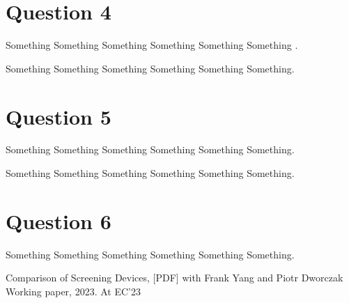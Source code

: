 \documentclass{article}
\begin{document}
\section*{Question 4}
\begin{questionbox}
Something Something Something Something Something Something .
\end{questionbox}

\begin{solutionbox}
  Something Something Something Something Something Something.
\end{solutionbox}

\section*{Question 5}
\begin{questionbox}
Something Something Something Something Something Something.
\end{questionbox}

\begin{solutionbox}
  Something Something Something Something Something Something.
\end{solutionbox}

\section*{Question 6}
\begin{questionbox}
Something Something Something Something Something Something.
\end{questionbox}

\begin{solutionbox}
  Comparison of Screening Devices, [PDF]
with Frank Yang and Piotr Dworczak
Working paper, 2023.
At EC’23
\end{solutionbox}
\end{document}
